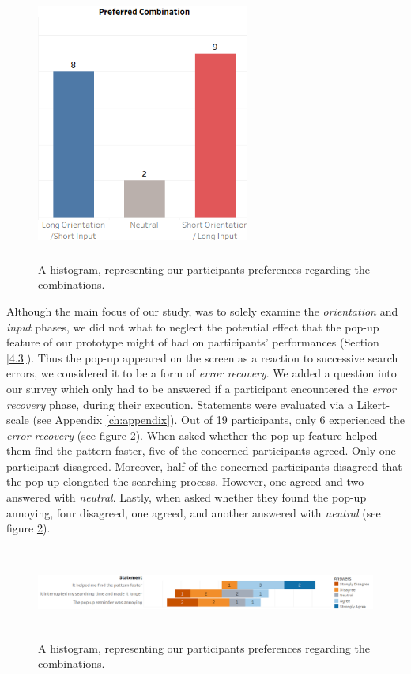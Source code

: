 \begin{figure}[t!]
\centering
\includegraphics[width=7cm, height=9cm]{Chapters/graphics/preference.png}
\caption{A histogram, representing our participants preferences regarding the combinations.}
\label{fig:preference}
\end{figure}

Although the main focus of our study, was to solely examine the \textit{orientation} and \textit{input} phases, we did not what to neglect the potential effect that the pop-up feature of our prototype might of had on participants' performances (Section \ref{4.3}). Thus the pop-up appeared on the screen as a reaction to successive search errors, we considered it to be a form of \textit{error recovery}. We added a question into our survey which only had to be answered if a participant encountered the \textit{error recovery} phase, during their execution. Statements were evaluated via a Likert-scale (see Appendix \ref{ch:appendix}). Out of 19 participants, only 6 experienced the \textit{error recovery} (see figure \ref{fig:error}). When asked whether the pop-up feature helped them find the pattern faster, five of the concerned participants agreed. Only one participant disagreed. Moreover, half of the concerned participants disagreed that the pop-up elongated the searching process. However, one agreed and two answered with \textit{neutral}. Lastly, when asked whether they found the pop-up annoying, four disagreed, one agreed, and another answered with \textit{neutral} (see figure \ref{fig:error}). \\


\begin{figure}[t!]
\centering
\includegraphics[width=15cm, height=3cm]{Chapters/graphics/ErrorRecovery.png}
\caption{A histogram, representing our participants preferences regarding the combinations.}
\label{fig:error}
\end{figure}





